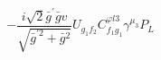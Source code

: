 %
\begin{dmath*}
%
  -  \frac{i \sqrt{2} {\bar g}^\prime {\bar g}{} v}{\sqrt{{\bar g}^{\prime 2} + {\bar g}{}^2}}U_{g_1 f_2} C^{ \varphi  l3}_{f_1 g_1} \gamma^{\mu_3} P_L
%
\end{dmath*}
%
